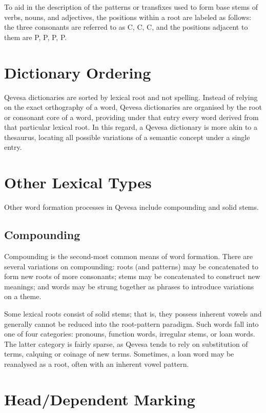 \documentclass[grammar]{subfiles}
\begin{document}
	To aid in the description of the patterns or transfixes used to form base stems of verbs, nouns, and adjectives, the positions within a root are labeled as follows: the three consonants are referred to as C, C, C, and the positions adjacent to them are P, P, P, P.
	
	\section{Dictionary Ordering}
	\label{sec:dictionary_ordering}

	Qevesa dictionaries are sorted by lexical root and not spelling. Instead of relying on the exact orthography of a word, Qevesa dictionaries are organised by the root or consonant core of a word, providing under that entry every word derived from that particular lexical root. In this regard, a Qevesa dictionary is more akin to a thesaurus, locating all possible variations of a semantic concept under a single entry.

	\section{Other Lexical Types}
	\label{sec:other_lexical_types}

	Other word formation processes in Qevesa include compounding and solid stems.

	\subsection{Compounding}
	\label{ssec:morph_compounding}

	Compounding is the second-most common means of word formation. There are several variations on compounding: roots (and patterns) may be concatenated to form new roots of more consonants; stems may be concatenated to construct new meanings; and words may be strung together as phrases to introduce variations on a theme.

	Some lexical roots consist of solid stems; that is, they possess inherent vowels and generally cannot be reduced into the root-pattern paradigm. Such words fall into one of four categories: pronouns, function words, irregular stems, or loan words. The latter category is fairly sparse, as Qevesa tends to rely on substitution of terms, calquing or coinage of new terms. Sometimes, a loan word may be reanalysed as a root, often with an inherent vowel pattern.
	
	\section{Head/Dependent Marking}
	\label{sec:head_dependent_marking}
\end{document}
